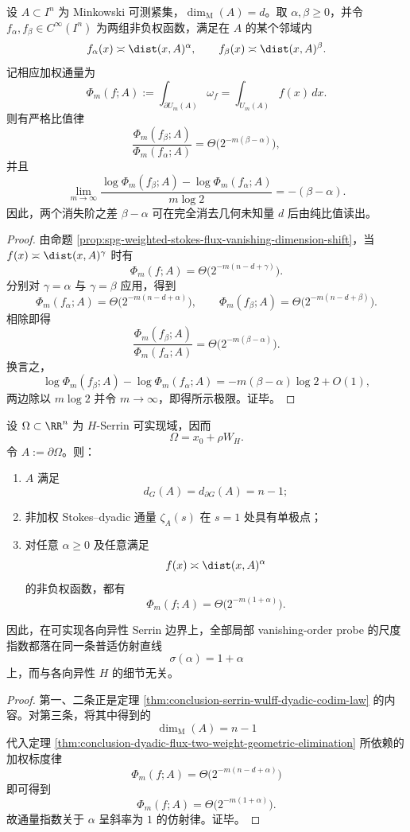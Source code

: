 \begin{theorem}[双权探针的几何消元律]\label{thm:conclusion-dyadic-flux-two-weight-geometric-elimination}
设 \(A\subset I^n\) 为 Minkowski 可测紧集，\(\dim_{\mathrm M}(A)=d\)。取 \(\alpha,\beta\ge 0\)，并令 \(f_\alpha,f_\beta\in C^\infty(I^n)\) 为两组非负权函数，满足在 \(A\) 的某个邻域内
\[
f_\alpha(x)\asymp \dist(x,A)^\alpha,
\qquad
f_\beta(x)\asymp \dist(x,A)^\beta.
\]
记相应加权通量为
\[
\Phi_m(f;A):=\int_{\partial U_m(A)}\omega_f=\int_{U_m(A)}f(x)\,dx.
\]
则有严格比值律
\[
\frac{\Phi_m(f_\beta;A)}{\Phi_m(f_\alpha;A)}
=
\Theta\!\bigl(2^{-m(\beta-\alpha)}\bigr),
\]
并且
\[
\lim_{m\to\infty}
\frac{\log \Phi_m(f_\beta;A)-\log \Phi_m(f_\alpha;A)}{m\log 2}
=-(\beta-\alpha).
\]
因此，两个消失阶之差 \(\beta-\alpha\) 可在完全消去几何未知量 \(d\) 后由纯比值读出。
\end{theorem}
\begin{proof}
由命题 \ref{prop:spg-weighted-stokes-flux-vanishing-dimension-shift}，当 \(f(x)\asymp \dist(x,A)^\gamma\) 时有
\[
\Phi_m(f;A)=\Theta\!\bigl(2^{-m(n-d+\gamma)}\bigr).
\]
分别对 \(\gamma=\alpha\) 与 \(\gamma=\beta\) 应用，得到
\[
\Phi_m(f_\alpha;A)=\Theta\!\bigl(2^{-m(n-d+\alpha)}\bigr),
\qquad
\Phi_m(f_\beta;A)=\Theta\!\bigl(2^{-m(n-d+\beta)}\bigr).
\]
相除即得
\[
\frac{\Phi_m(f_\beta;A)}{\Phi_m(f_\alpha;A)}
=
\Theta\!\bigl(2^{-m(\beta-\alpha)}\bigr).
\]
换言之，
\[
\log \Phi_m(f_\beta;A)-\log \Phi_m(f_\alpha;A)
=
-m(\beta-\alpha)\log 2+O(1),
\]
两边除以 \(m\log 2\) 并令 \(m\to\infty\)，即得所示极限。证毕。
\end{proof}

\begin{corollary}\label{cor:conclusion-serrin-wulff-weighted-flux-affine-law}
设 \(\Omega\subset\RR^n\) 为 \(H\)-Serrin 可实现域，因而
\[
\Omega=x_0+\rho W_H.
\]
令 \(A:=\partial\Omega\)。则：
\begin{enumerate}
  \item \(A\) 满足
  \[
  d_G(A)=d_{\partial G}(A)=n-1;
  \]
  \item 非加权 Stokes--dyadic 通量 \(\zeta_A(s)\) 在 \(s=1\) 处具有单极点；
  \item 对任意 \(\alpha\ge 0\) 及任意满足
  \[
  f(x)\asymp \dist(x,A)^\alpha
  \]
  的非负权函数，都有
  \[
  \Phi_m(f;A)=\Theta\!\bigl(2^{-m(1+\alpha)}\bigr).
  \]
\end{enumerate}
因此，在可实现各向异性 Serrin 边界上，全部局部 vanishing-order probe 的尺度指数都落在同一条普适仿射直线
\[
\sigma(\alpha)=1+\alpha
\]
上，而与各向异性 \(H\) 的细节无关。
\end{corollary}
\begin{proof}
第一、二条正是定理 \ref{thm:conclusion-serrin-wulff-dyadic-codim-law} 的内容。对第三条，将其中得到的
\[
\dim_{\mathrm M}(A)=n-1
\]
代入定理 \ref{thm:conclusion-dyadic-flux-two-weight-geometric-elimination} 所依赖的加权标度律
\[
\Phi_m(f;A)=\Theta\!\bigl(2^{-m(n-d+\alpha)}\bigr)
\]
即可得到
\[
\Phi_m(f;A)=\Theta\!\bigl(2^{-m(1+\alpha)}\bigr).
\]
故通量指数关于 \(\alpha\) 呈斜率为 \(1\) 的仿射律。证毕。
\end{proof}

